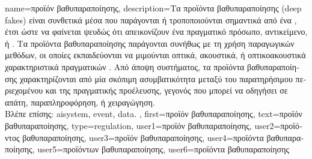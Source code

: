 {name={\foreignlanguage{greek}{προϊόν βαθυπαραποίησης}},
	description={\foreignlanguage{greek}{Τα προϊόντα βαθυπαραποίησης} (deep 
		fakes) \foreignlanguage{greek}{εί\-ναι 
		συνθετικά μέσα που παράγονται ή τροποποιούνται σημαντικά από ένα}
		, \foreignlanguage{greek}{έτσι ώστε να φαίνεται ψευδώς ότι 
		απεικονίζουν ένα πραγματικό πρόσωπο, αντικείμενο, ή} . 
		\foreignlanguage{greek}{Τα προϊόντα βαθυπαραποίησης παράγονται συνήθως 
		με τη χρήση παραγωγικών μεθόδων, οι οποίες εκπαιδεύονται να μιμούνται οπτικά, 
		ακουστικά, ή οπτικοακουστικά χαρακτηριστικά πραγματικών} . 
		\foreignlanguage{greek}{Από άποψη συστήματος, τα προϊόντα βαθυπαραποίησης
		χαρακτηρίζονται από μία σκόπιμη ασυμβατικότητα
            	μεταξύ του παρατηρήσιμου περιεχομένου και της πραγματικής προέλευσης, 
		γεγονός που μπορεί να οδηγήσει σε απάτη, παραπληροφόρηση, ή χειραγώγηση.} 
		\\
		\foreignlanguage{greek}{Βλέπε επίσης:} \gls{aisystem}, \gls{event}, \gls{data}.	},
 	first={\foreignlanguage{greek}{προϊόν βαθυπαραποίησης}},
 	text={\foreignlanguage{greek}{προϊόν βαθυπαραποίησης}},
	type=regulation,
	user1={\foreignlanguage{greek}{προϊόν βαθυπαραποίησης}}, %
	user2={\foreignlanguage{greek}{προϊόντος βαθυπαραποίησης}}, %
	user3={\foreignlanguage{greek}{προϊόν βαθυπαραποίησης}}, %
	user4={\foreignlanguage{greek}{προϊόντα βαθυπαραποίησης}}, %
	user5={\foreignlanguage{greek}{προϊόντων βαθυπαραποίησης}}, %
	user6={\foreignlanguage{greek}{προϊόντα βαθυπαραποίησης}} %
}

